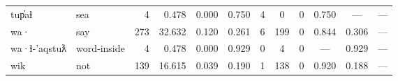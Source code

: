 \begin{landscape}
\begin{longtable}[c]{ l l | r r c c | c c c | c c c }
  tup̓aɬ              & sea                       & 4   & 0.478                     & 0.000           & 0.750      & 4         & 0           & 0            & 0.750     & —           & —\\
  wa·                & say                       & 273 & 32.632                    & 0.120           & 0.261      & 6         & 199         & 0            & 0.844     & 0.306       & —\\
  wa·ɬ‑'aqstuƛ       & word‑inside               & 4   & 0.478                     & 0.000           & 0.929      & 0         & 4           & 0            & —         & 0.929       & —\\
  wik                & not                       & 139 & 16.615                    & 0.039           & 0.190      & 1         & 138         & 0            & 0.920     & 0.188       & —\\

  \bottomrule

\end{longtable}

\end{landscape}
